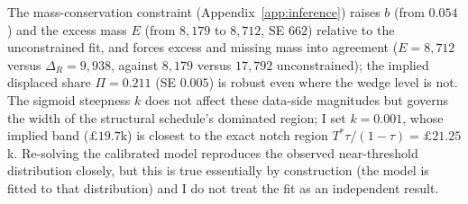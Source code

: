 The mass-conservation constraint (Appendix~\ref{app:inference}) raises $b$ (from
$0.054$) and the excess mass $E$ (from $8{,}179$ to $8{,}712$, SE $662$) relative
to the unconstrained fit, and forces excess and missing mass into agreement
($E=8{,}712$ versus $\Delta_{R}=9{,}938$, against $8{,}179$ versus $17{,}792$
unconstrained); the implied displaced share $\Pi=0.211$ (SE $0.005$) is robust
even where the wedge level is not. The sigmoid steepness $k$ does not affect these
data-side magnitudes but governs the width of the structural schedule's dominated
region; I set $k=0.001$, whose implied band ($\pounds19.7$k) is closest to the
exact \citet{klevenwaseem2013} notch region $T^{*}\tau/(1-\tau)=\pounds21.25$k.
Re-solving the calibrated model reproduces the observed near-threshold
distribution closely, but this is true essentially by construction (the model is
fitted to that distribution) and I do not treat the fit as an independent result.
